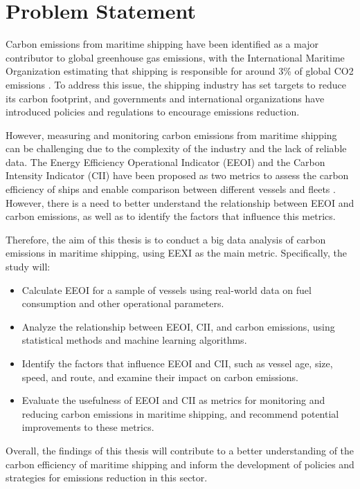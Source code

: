 \section{Problem Statement}

Carbon emissions from maritime shipping have been identified as a major contributor to global greenhouse gas emissions, with the International Maritime Organization estimating that shipping is responsible for around 3\% of global CO2 emissions \autocite{king_anthony_2022}.
To address this issue, the shipping industry has set targets to reduce its carbon footprint, and governments and international organizations have introduced policies and regulations to encourage emissions reduction.

However, measuring and monitoring carbon emissions from maritime shipping can be challenging due to the complexity of the industry and the lack of reliable data.
The Energy Efficiency Operational Indicator (EEOI) and the Carbon Intensity Indicator (CII) have been proposed as two metrics to assess the carbon efficiency of ships and enable comparison between different vessels and fleets \autocite{ZHANG2019118223,CHUAH2023115348}.
However, there is a need to better understand the relationship between EEOI and carbon emissions, as well as to identify the factors that influence this metrics.

Therefore, the aim of this thesis is to conduct a big data analysis of carbon emissions in maritime shipping, using EEXI as the main metric. Specifically, the study will:

\begin{itemize}
    \item Calculate EEOI for a sample of vessels using real-world data on fuel consumption and other operational parameters.
    \item Analyze the relationship between EEOI, CII, and carbon emissions, using statistical methods and machine learning algorithms.
    \item Identify the factors that influence EEOI and CII, such as vessel age, size, speed, and route, and examine their impact on carbon emissions.
    \item Evaluate the usefulness of EEOI and CII as metrics for monitoring and reducing carbon emissions in maritime shipping, and recommend potential improvements to these metrics.
\end{itemize}


Overall, the findings of this thesis will contribute to a better understanding of the carbon efficiency of maritime shipping and inform the development of policies and strategies for emissions reduction in this sector.